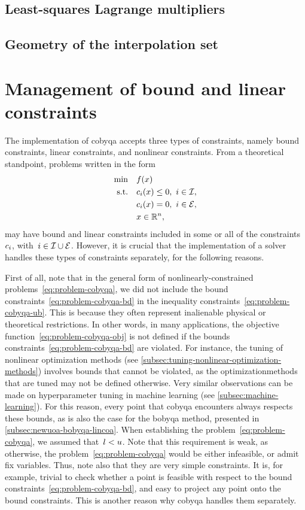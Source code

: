 \subsection{Least-squares Lagrange multipliers}

\subsection{Geometry of the interpolation set}

\section{Management of bound and linear constraints}
\label{sec:simple-constraints}

The implementation of \gls{cobyqa} accepts three types of constraints, namely bound constraints, linear constraints, and nonlinear constraints.
From a theoretical standpoint, problems written in the form
\begin{align*}
    \min        & \quad \obj(\iter)\\
    \text{s.t.} & \quad \con{i}(\iter) \le 0, ~ i \in \iub,\\
                & \quad \con{i}(\iter) = 0, ~ i \in \ieq,\\
                & \quad \iter \in \R^n,
\end{align*}
may have bound and linear constraints included in some or all of the constraints~$c_{i}$, with~$i \in \mathcal{I} \cup \mathcal{E}$.
However, it is crucial that the implementation of a solver handles these types of constraints separately, for the following reasons.

First of all, note that in the general form of nonlinearly-constrained problems~\cref{eq:problem-cobyqa}, we did not include the bound constraints~\cref{eq:problem-cobyqa-bd} in the inequality constraints~\cref{eq:problem-cobyqa-ub}.
This is because they often represent inalienable physical or theoretical restrictions.
In other words, in many applications, the objective function~\cref{eq:problem-cobyqa-obj} is not defined if the bounds constraints~\cref{eq:problem-cobyqa-bd} are violated.
For instance, the tuning of nonlinear optimization methods (see \cref{subsec:tuning-nonlinear-optimization-methods})  involves bounds that cannot be violated, as the optimizationmethods that are tuned may not be defined otherwise.
Very similar observations can be made on hyperparameter tuning in machine learning (see \cref{subsec:machine-learning}).
For this reason, every point that \gls{cobyqa} encounters always respects these bounds, as is also the case for the \gls{bobyqa} method, presented in \cref{subsec:newuoa-bobyqa-lincoa}.
When establishing the problem~\cref{eq:problem-cobyqa}, we assumed that~$l < u$.
Note that this requirement is weak, as otherwise, the problem~\cref{eq:problem-cobyqa} would be either infeasible, or admit fix variables.
Thus, note also that they are very simple constraints.
It is, for example, trivial to check whether a point is feasible with respect to the bound constraints~\cref{eq:problem-cobyqa-bd}, and easy to project any point onto the bound constraints.
This is another reason why \gls{cobyqa} handles them separately.

